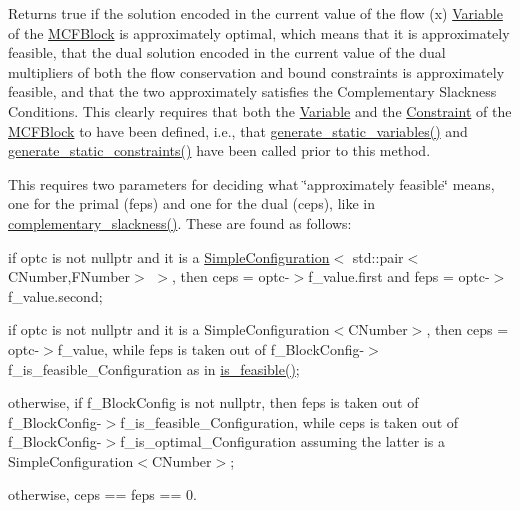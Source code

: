 Returns true if the solution encoded in the current value of the flow (x) \mbox{\hyperlink{class_s_m_spp__di__unipi__it_1_1_variable}{Variable}} of the \mbox{\hyperlink{class_s_m_spp__di__unipi__it_1_1_m_c_f_block}{M\+C\+F\+Block}} is approximately optimal, which means that it is approximately feasible, that the dual solution encoded in the current value of the dual multipliers of both the flow conservation and bound constraints is approximately feasible, and that the two approximately satisfies the Complementary Slackness Conditions. This clearly requires that both the \mbox{\hyperlink{class_s_m_spp__di__unipi__it_1_1_variable}{Variable}} and the \mbox{\hyperlink{class_s_m_spp__di__unipi__it_1_1_constraint}{Constraint}} of the \mbox{\hyperlink{class_s_m_spp__di__unipi__it_1_1_m_c_f_block}{M\+C\+F\+Block}} to have been defined, i.\+e., that \mbox{\hyperlink{class_s_m_spp__di__unipi__it_1_1_m_c_f_block_a599bd50cdc6123555aa4a6c4e22c996d}{generate\+\_\+static\+\_\+variables()}} and \mbox{\hyperlink{class_s_m_spp__di__unipi__it_1_1_m_c_f_block_a33f94035590874ef8616982e11e7bb43}{generate\+\_\+static\+\_\+constraints()}} have been called prior to this method.

This requires two parameters for deciding what \char`\"{}approximately feasible\char`\"{} means, one for the primal (feps) and one for the dual (ceps), like in \mbox{\hyperlink{class_s_m_spp__di__unipi__it_1_1_m_c_f_block_a7c6d8d4ff78950993ded5d1abfd4fe53}{complementary\+\_\+slackness()}}. These are found as follows\+:


\begin{DoxyItemize}
\item if optc is not nullptr and it is a \mbox{\hyperlink{class_s_m_spp__di__unipi__it_1_1_simple_configuration}{Simple\+Configuration}}$<$ std\+::pair$<$\+C\+Number,\+F\+Number$>$ $>$, then ceps = optc-\/$>$f\+\_\+value.\+first and feps = optc-\/$>$f\+\_\+value.\+second;
\item if optc is not nullptr and it is a Simple\+Configuration$<$\+C\+Number$>$, then ceps = optc-\/$>$f\+\_\+value, while feps is taken out of f\+\_\+\+Block\+Config-\/$>$f\+\_\+is\+\_\+feasible\+\_\+\+Configuration as in \mbox{\hyperlink{class_s_m_spp__di__unipi__it_1_1_m_c_f_block_a162cd7d8375d705f0b15d8e847098763}{is\+\_\+feasible()}};
\item otherwise, if f\+\_\+\+Block\+Config is not nullptr, then feps is taken out of f\+\_\+\+Block\+Config-\/$>$f\+\_\+is\+\_\+feasible\+\_\+\+Configuration, while ceps is taken out of f\+\_\+\+Block\+Config-\/$>$f\+\_\+is\+\_\+optimal\+\_\+\+Configuration assuming the latter is a Simple\+Configuration$<$\+C\+Number$>$;
\item otherwise, ceps == feps == 0. 
\end{DoxyItemize}

